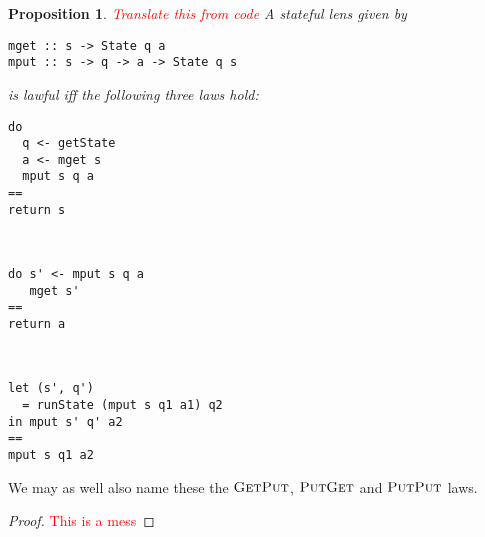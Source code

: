 \documentclass[11pt,letterpaper]{article}
\theoremstyle{plain}
\newtheorem{proposition}[theorem]{Proposition}
\theoremstyle{definition}
\newcommand{\C}{\mathscr{C}}
\newcommand{\homC}{\underline{\C}}
\newcommand{\fget}{\textsc{Get}}
\newcommand{\fput}{\textsc{Put}}
\newcommand{\todo}[1]{\textcolor{red}{\small #1}}
\begin{document}
\begin{proposition}
\todo{Translate this from code}
A stateful lens given by
\begin{verbatim}
mget :: s -> State q a
mput :: s -> q -> a -> State q s
\end{verbatim}
is lawful iff the following three laws hold: \\
\begin{minipage}{\textwidth}
\begin{multicols}{3}
\begin{verbatim}
do
  q <- getState
  a <- mget s
  mput s q a
==
return s
\end{verbatim}
~\columnbreak
\begin{verbatim}
do s' <- mput s q a
   mget s'
==
return a
\end{verbatim}
~\columnbreak
\begin{verbatim}
let (s', q')
  = runState (mput s q1 a1) q2
in mput s' q' a2
==
mput s q1 a2
\end{verbatim}
\end{multicols}
\end{minipage}
\end{proposition}
We may as well also name these the $\fget\fput$, $\fput\fget$ and $\fput\fput$ laws.
\begin{proof}
\todo{This is a mess}
\end{proof}
\end{document}
